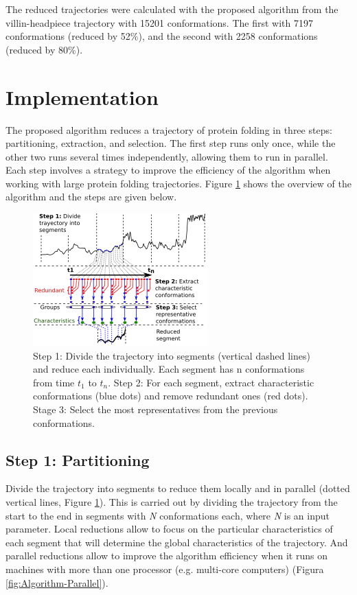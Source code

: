 \documentclass[american,twocolumn]{bmcart}
\begin{document}
The reduced trajectories were calculated with the proposed algorithm from the villin-headpiece trajectory with 15201 conformations. The first with 7197 conformations (reduced by 52\%), and the second with 2258 conformations (reduced by 80\%). 

\section*{Implementation}

The proposed algorithm reduces a trajectory of protein folding in three steps: partitioning, extraction, and selection. The first step runs only once, while the other two runs several times independently, allowing them to run in parallel. Each step involves a strategy to improve the efficiency of the algorithm when working with large protein folding trajectories. Figure \ref{fig:Algorithm-Description} shows the overview of the algorithm and the steps are given below.

\begin{figure}[th]
\includegraphics[scale=1.2]{images/algorithm-description-general}

\caption{ Step 1: Divide the trajectory into segments (vertical dashed lines) and reduce each individually. Each segment has n conformations from time $t_1$ to $t_n$. Step 2: For each segment, extract characteristic conformations (blue dots) and remove redundant ones (red dots). Stage 3: Select the most representatives from the previous conformations. \label{fig:Algorithm-Description}}
\end{figure}


\subsection*{Step 1: Partitioning}

Divide the trajectory into segments to reduce them locally and in parallel (dotted vertical lines, Figure \ref{fig:Algorithm-Description}). This is carried out by dividing the trajectory from the start to the end in segments with \emph{N} conformations each, where \emph{N} is an input parameter. Local reductions allow to focus on the particular characteristics of each segment that will determine the global characteristics of the trajectory. And parallel reductions allow to improve the algorithm efficiency when it runs on machines with more than one processor (e.g. multi-core computers) (Figura \ref{fig:Algorithm-Parallel}).
\end{document}
